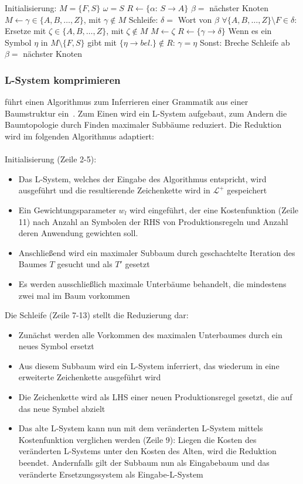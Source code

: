 \begin{algorithm}[caption={Inferieren eines L-Systems aus einer Baumstruktur}, label={alg2}]
    Initialisierung:
        $M=\{F,S\}$
        $\omega=S$
        $R \gets \{\alpha$: $S \rightarrow A\}$
        $\beta=$ nächster Knoten
        $M \gets \gamma \in \{A,B,\dots,Z\}$, mit $\gamma \notin M$
    Schleife:
        $\delta=$ Wort von $\beta$
        $\forall \{A,B,\dots,Z\} \setminus F \in \delta:$
        Ersetze mit $\zeta \in \{A,B,\dots,Z\}$, mit $\zeta \notin M$
        $M \gets \zeta$
        $R \gets \{\gamma\rightarrow\delta\}$
        Wenn es ein Symbol $\eta$ in $M\setminus\{F,S\}$ gibt mit $\{\eta \rightarrow bel.\} \notin R$:
            $\gamma=\eta$
        Sonst:
            Breche Schleife ab
        $\beta=$ nächster Knoten
\end{algorithm}

\subsubsection*{L-System komprimieren}
\citeauthor{guo_2020} führt einen Algorithmus zum Inferrieren einer Grammatik aus einer Baumstruktur ein~\cite{guo_2020}.
Zum Einen wird ein L-System aufgebaut, zum Andern die Baumtopologie durch Finden maximaler Subbäume reduziert.
Die Reduktion wird im folgenden Algorithmus adaptiert:\\~\\
Initialisierung (Zeile 2-5):
\begin{itemize}
    \item Das L-System, welches der Eingabe des Algorithmus entspricht, wird ausgeführt und
    die resultierende Zeichenkette wird in $\mathcal{L^+}$ gespeichert
    \item Ein Gewichtungsparameter $w_l$ wird eingeführt, der eine Kostenfunktion (Zeile 11) nach Anzahl an Symbolen
    der RHS von Produktionsregeln und Anzahl deren Anwendung gewichten soll.
    \item Anschließend wird ein maximaler Subbaum durch geschachtelte Iteration des Baumes $T$ gesucht und als $T'$ gesetzt
    \item Es werden ausschließlich maximale Unterbäume behandelt, die mindestens zwei mal im Baum vorkommen
\end{itemize}
Die Schleife (Zeile 7-13) stellt die Reduzierung dar:
\begin{itemize}
    \item Zunächst werden alle Vorkommen des maximalen Unterbaumes durch ein neues Symbol ersetzt
    \item Aus diesem Subbaum wird ein L-System inferriert, das wiederum in eine erweiterte Zeichenkette ausgeführt wird
    \item Die Zeichenkette wird als LHS einer neuen Produktionsregel gesetzt, die auf das neue Symbel abzielt
    \item Das alte L-System kann nun mit dem veränderten L-System mittels Kostenfunktion verglichen werden (Zeile 9):
    Liegen die Kosten des veränderten L-Systems unter den Kosten des Alten, wird die Reduktion beendet.
    Andernfalls gilt der Subbaum nun als Eingabebaum und das veränderte Ersetzungssystem als Eingabe-L-System
\end{itemize}

